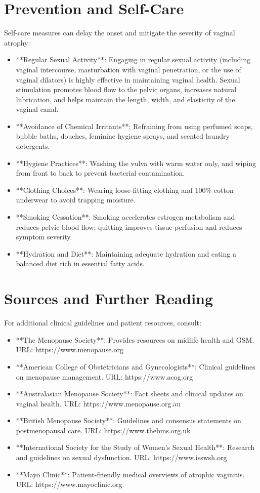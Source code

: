 \section*{Prevention and Self-Care}
Self-care measures can delay the onset and mitigate the severity of vaginal atrophy:
\begin{itemize}
\item **Regular Sexual Activity**: Engaging in regular sexual activity (including vaginal intercourse, masturbation with vaginal penetration, or the use of vaginal dilators) is highly effective in maintaining vaginal health. Sexual stimulation promotes blood flow to the pelvic organs, increases natural lubrication, and helps maintain the length, width, and elasticity of the vaginal canal.
\item **Avoidance of Chemical Irritants**: Refraining from using perfumed soaps, bubble baths, douches, feminine hygiene sprays, and scented laundry detergents.
\item **Hygiene Practices**: Washing the vulva with warm water only, and wiping from front to back to prevent bacterial contamination.
\item **Clothing Choices**: Wearing loose-fitting clothing and 100\% cotton underwear to avoid trapping moisture.
\item **Smoking Cessation**: Smoking accelerates estrogen metabolism and reduces pelvic blood flow; quitting improves tissue perfusion and reduces symptom severity.
\item **Hydration and Diet**: Maintaining adequate hydration and eating a balanced diet rich in essential fatty acids.
\end{itemize}

\section*{Sources and Further Reading}
For additional clinical guidelines and patient resources, consult:
\begin{itemize}
\item **The Menopause Society**: Provides resources on midlife health and GSM. URL: https://www.menopause.org
\item **American College of Obstetricians and Gynecologists**: Clinical guidelines on menopause management. URL: https://www.acog.org
\item **Australasian Menopause Society**: Fact sheets and clinical updates on vaginal health. URL: https://www.menopause.org.au
\item **British Menopause Society**: Guidelines and consensus statements on postmenopausal care. URL: https://www.thebms.org.uk
\item **International Society for the Study of Women's Sexual Health**: Research and guidelines on sexual dysfunction. URL: https://www.isswsh.org
\item **Mayo Clinic**: Patient-friendly medical overviews of atrophic vaginitis. URL: https://www.mayoclinic.org
\end{itemize}
